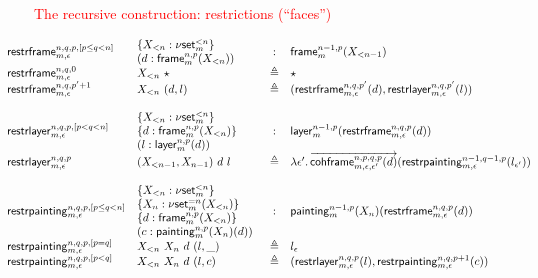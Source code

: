\documentclass[12pt,landscape]{article}
\newcommand{\defeq}{\triangleq}
\newcommand{\partialcubset}[2]{\mathsf{\nu set}_{#1}^{<#2}}
\newcommand{\mycubsetcomp}[2]{\mathsf{\nu set}_{#1}^{=#2}}
\newcommand{\mybox}[1]{\mathsf{frame}_{#1}}
\newcommand{\mylayer}[1]{\mathsf{layer}_{#1}}
\newcommand{\mycube}[1]{\mathsf{painting}_{#1}}
\newcommand{\unitpoint}{\star}
\newcommand{\downbox}[2]{\mathsf{restrframe}_{#1,#2}}
\newcommand{\downlayer}[2]{\mathsf{restrlayer}_{#1,#2}}
\newcommand{\downcube}[2]{\mathsf{restrpainting}_{#1,#2}}
\newcommand{\cohbox}[2]{\mathsf{cohframe}_{#1,#2}}
\begin{document}
\begin{Large}
\begin{sf}
\newpage

\begin{center}
\textcolor{red}{\huge The recursive construction: restrictions (``faces'')}
\end{center}

\begin{large}
$$\hspace{-1cm}
\begin{array}{llcl}
\downbox{m}{\epsilon}^{n,q,p,[p \leq q < n]} & \!\!\!\begin{array}{l}\{X_{<n}:\partialcubset{m}{n}\}\\(d:\mybox{m}^{n,p}(X_{<n}))\end{array}& : & \mybox{m}^{n-1,p}(X_{<n-1})\\
\downbox{m}{\epsilon}^{n,q,0} & X_{<n}~\unitpoint & \defeq & \unitpoint\\
\downbox{m}{\epsilon}^{n,q,p'+1} & X_{<n}~(d,l) & \defeq & (\downbox{m}{\epsilon}^{n,q,p'}(d),\downlayer{m}{\epsilon}^{n,q,p'}(l))\\
\\
\downlayer{m}{\epsilon}^{n,q,p,[p < q < n]} & \!\!\!\begin{array}{l}\{X_{<n}:\partialcubset{m}{n}\}\\\{d:\mybox{m}^{n,p}(X_{<n})\}\\(l:\mylayer{m}^{n,p}(d))\end{array}& : & \mylayer{m}^{n-1,p}(\downbox{m}{\epsilon}^{n,q,p}(d))\\
\downlayer{m}{\epsilon}^{n,q,p} & (X_{<n-1},X_{n-1})~d~l & \defeq & \lambda\epsilon'.\,\overrightarrow{\cohbox{m}{\epsilon,\epsilon'}^{n,p,q,p}(d)}(\downcube{m}{\epsilon}^{n-1,q-1,p}(l_{\epsilon'}))\\
\\
\downcube{m}{\epsilon}^{n,q,p,[p \leq q < n]} & \!\!\!\begin{array}{l}\{X_{<n}:\partialcubset{m}{n}\}\\\{X_n:\mycubsetcomp{m}{n}(X_{<n})\}\\\{d:\mybox{m}^{n,p}(X_{<n})\}\\(c:\mycube{m}^{n,p}(X_n)(d))\end{array}& : & \mycube{m}^{n-1,p}(X_{n})(\downbox{m}{\epsilon}^{n,q,p}(d))\\
\downcube{m}{\epsilon}^{n,q,p,[p=q]} & X_{<n}~X_n~d~(l,\_) & \defeq & l_{\epsilon}\\
\downcube{m}{\epsilon}^{n,q,p,[p<q]} & X_{<n}~X_n~d~(l,c) & \defeq & (\downlayer{m}{\epsilon}^{n,q,p}(l),\downcube{m}{\epsilon}^{n,q,p+1}(c))\\
\\
\end{array}
$$
\end{large}


\end{sf}
\end{Large}
\end{document}

